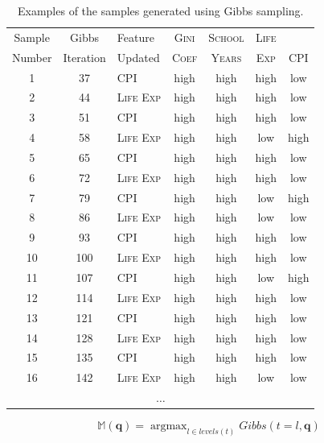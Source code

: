 \documentclass[xcolor={table}]{beamer}
\newcommand{\featN}[1]{\textsc{#1}}
\DeclareMathOperator*{\argmax}{argmax}
\begin{document}
 \begin{frame} 
\begin{table}[htb]
	\caption{Examples of the samples generated using Gibbs sampling.}
	\label{tab:gibbsdata}
\begin{center}
\begin{footnotesize}
		\begin{tabular}{cclcccc}
\hline		
Sample	&	Gibbs	&	Feature	&	\featN{Gini}	&	\featN{School}	&	\featN{Life}	&		\\
Number	&	Iteration	&	Updated	&	\featN{Coef}	&	\featN{Years}	&	\featN{Exp}	&	\featN{CPI}	\\
\hline
1	&	37	&	\featN{CPI}	&	high	&	high	&	high	&	low	\\
2	&	44	&	\featN{Life Exp}	&	high	&	high	&	high	&	low	\\
3	&	51	&	\featN{CPI}	&	high	&	high	&	high	&	low	\\
4	&	58	&	\featN{Life Exp}	&	high	&	high	&	low	&	high	\\
5	&	65	&	\featN{CPI}	&	high	&	high	&	high	&	low	\\
6	&	72	&	\featN{Life Exp}	&	high	&	high	&	high	&	low	\\
7	&	79	&	\featN{CPI}	&	high	&	high	&	low	&	high	\\
8	&	86	&	\featN{Life Exp}	&	high	&	high	&	low	&	low	\\
9	&	93	&	\featN{CPI}	&	high	&	high	&	high	&	low	\\
10	&	100	&	\featN{Life Exp}	&	high	&	high	&	high	&	low	\\
11	&	107	&	\featN{CPI}	&	high	&	high	&	low	&	high	\\
12	&	114	&	\featN{Life Exp}	&	high	&	high	&	high	&	low	\\
13	&	121	&	\featN{CPI}	&	high	&	high	&	high	&	low	\\
14	&	128	&	\featN{Life Exp}	&	high	&	high	&	high	&	low	\\
15	&	135	&	\featN{CPI}	&	high	&	high	&	high	&	low	\\
16	&	142	&	\featN{Life Exp}	&	high	&	high	&	low	&	low	\\\multicolumn{7}{c}{$\dots$}\\
\hline
\end{tabular}
\end{footnotesize}
\end{center}
\end{table}
\end{frame} 

 \begin{frame} 
\begin{equation}
\mathbb{M}(\mathbf{q}) = \argmax_{l \in levels(t)} Gibbs\left(t=l,\mathbf{q}\right)
\end{equation}
\end{frame} 
\end{document}
